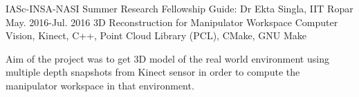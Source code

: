 \begin{cvexperience}
    \cvexp
    {IASc-INSA-NASI Summer Research Fellowship}
    {Guide: Dr Ekta Singla, IIT Ropar}
    {May. 2016-Jul. 2016}
    {3D Reconstruction for Manipulator Workspace}
    {Computer Vision, Kinect, C++, Point Cloud Library (PCL), CMake, GNU Make}
    {
      \begin{expitems}
        \item {Aim of the project was to get 3D model of the real world environment using multiple depth snapshots from Kinect sensor in order to compute the manipulator workspace in that environment.}
      \end{expitems}
    }
\end{cvexperience}
